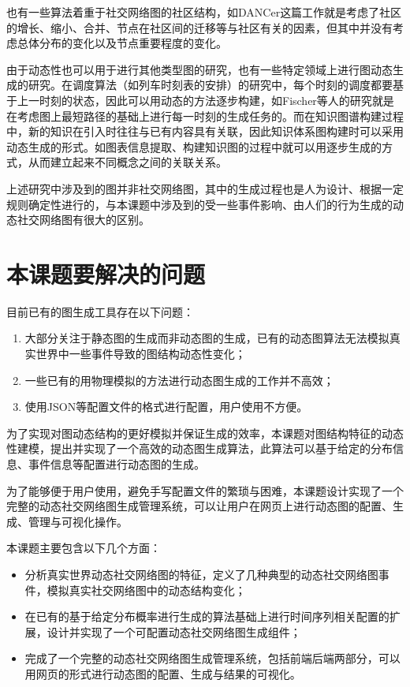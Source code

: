 也有一些算法着重于社交网络图的社区结构，如DANCer\cite{DANCer}这篇工作就是考虑了社区的增长、缩小、合并、节点在社区间的迁移等与社区有关的因素，但其中并没有考虑总体分布的变化以及节点重要程度的变化。

由于动态性也可以用于进行其他类型图的研究，也有一些特定领域上进行图动态生成的研究。在调度算法（如列车时刻表的安排）的研究中，每个时刻的调度都要基于上一时刻的状态，因此可以用动态的方法逐步构建，如Fischer等人的研究\cite{Fischer2011Dynamic}就是在考虑图上最短路径的基础上进行每一时刻的生成任务的。而在知识图谱构建过程中，新的知识在引入时往往与已有内容具有关联，因此知识体系图构建时可以采用动态生成的形式。如图表信息提取、构建知识图的过程中就可以用逐步生成的方式\cite{Kim2017Dynamic}，从而建立起来不同概念之间的关联关系。

上述研究中涉及到的图并非社交网络图，其中的生成过程也是人为设计、根据一定规则确定性进行的，与本课题中涉及到的受一些事件影响、由人们的行为生成的动态社交网络图有很大的区别。

\section{本课题要解决的问题}
\label{content:problem}

目前已有的图生成工具存在以下问题：

\begin{enumerate}
  \item 大部分关注于静态图的生成而非动态图的生成，已有的动态图算法无法模拟真实世界中一些事件导致的图结构动态性变化；
  \item 一些已有的用物理模拟的方法\cite{De2014Dynamic}进行动态图生成的工作并不高效；
  \item 使用JSON等配置文件的格式进行配置\cite{FastSGG}，用户使用不方便。
\end{enumerate}

\vspace{0.2cm}

为了实现对图动态结构的更好模拟并保证生成的效率，本课题对图结构特征的动态性建模，提出并实现了一个高效的动态图生成算法，此算法可以基于给定的分布信息、事件信息等配置进行动态图的生成。

为了能够便于用户使用，避免手写配置文件的繁琐与困难，本课题设计实现了一个完整的动态社交网络图生成管理系统，可以让用户在网页上进行动态图的配置、生成、管理与可视化操作。

本课题主要包含以下几个方面：

\begin{itemize}
  \item 分析真实世界动态社交网络图的特征，定义了几种典型的动态社交网络图事件，模拟真实社交网络图中的动态结构变化；
  \item 在已有的基于给定分布概率进行生成的算法\cite{FastSGG}基础上进行时间序列相关配置的扩展，设计并实现了一个可配置动态社交网络图生成组件；
  \item 完成了一个完整的动态社交网络图生成管理系统，包括前端后端两部分，可以用网页的形式进行动态图的配置、生成与结果的可视化。
\end{itemize}

